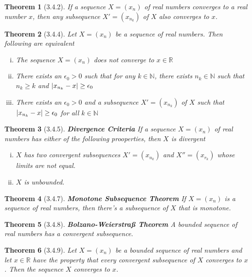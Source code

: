 \documentclass{article}
\newtheorem*{theorem}{Theorem}
\DeclarePairedDelimiter\abs{\lvert}{\rvert}%
\begin{document}
\begin{theorem}[3.4.2] If a sequence $X=(x_n)$ of real numbers converges to a real 
  number $x$, then any subsequence $X'=(x_{n_k})$ of $X$ also converges to $x$.
\end{theorem}

\begin{theorem}[3.4.4] Let $X=(x_n)$ be a sequence of real numbers. Then following
  are equivalent
  \begin{enumerate}[(i)]
    \item The sequence $X=(x_n)$ does not converge to $x \in{\mathbb{R}}$
    \item There exists an $\epsilon_0>0$ such that for any $k \in{\mathbb{N}}$, there exists
      $n_k \in{\mathbb{N}}$ such that $n_k\ge{k}$ and $\abs{x_{n_k}-x}\ge{\epsilon_0}$
    \item There exists an $\epsilon_0>0$ and a subsequence $X'=(x_{n_k})$ of $X$ such that 
      $\abs{x_{n_k}-x}\ge{\epsilon_0}$ for all $k \in{\mathbb{N}}$
  \end{enumerate}
\end{theorem}

\begin{theorem}[3.4.5] \textbf{Divergence Criteria} If a sequence $X=(x_n)$ of real numbers
  has either of the following prooperties, then $X$ is divergent
  \begin{enumerate}[(i)]
    \item $X$ has two convergent subsequences $X'=(x_{n_k})$ and $X''=(x_{r_k})$ whose limits are not equal.
    \item $X$ is unbounded.
  \end{enumerate}
\end{theorem}

\begin{theorem}[3.4.7] \textbf{Monotone Subsequence Theorem} If $X=(x_n)$ is a sequence of real numbers,
  then there's a subsequence of $X$ that is monotone.
\end{theorem}

\begin{theorem}[3.4.8] \textbf{Bolzano-Weierstraß Theorem} A bounded sequence of real numbers has
  a convergent subsequence.
\end{theorem}

\begin{theorem}[3.4.9] Let $X=(x_n)$ be a bounded sequence of real numbers and let $x \in{\mathbb{R}}$
  have the property that every convergent subsequence of $X$ converges to $x$. Then the sequence
  $X$ converges to $x$.
\end{theorem}
\end{document}
